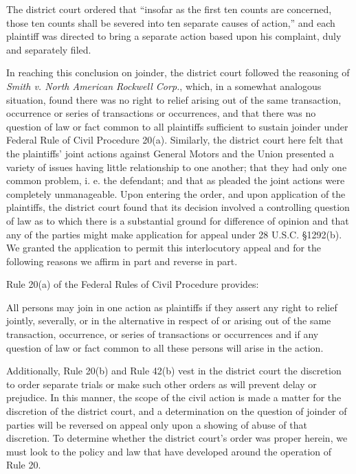 \documentclass[11pt,letterpaper,twoside]{article}
\renewenvironment{quote}{%
   \list{}{%
     \leftmargin2em   %
     \rightmargin\leftmargin\parsep .1em }
   \item\relax
}
{\endlist}
\begin{document}
The district court ordered that ``insofar as the first ten counts are
concerned, those ten counts shall be severed into ten separate causes of
action,'' and each plaintiff was directed to bring a separate action
based upon his complaint, duly and separately filed.

In reaching this conclusion on joinder, the district court followed the
reasoning of \emph{Smith v. North American Rockwell Corp.}, which, in a
somewhat analogous situation, found there was no right to relief arising
out of the same transaction, occurrence or series of transactions or
occurrences, and that there was no question of law or fact common to all
plaintiffs sufficient to sustain joinder under Federal Rule of Civil
Procedure 20(a). Similarly, the district court here felt that the
plaintiffs' joint actions against General Motors and the Union presented
a variety of issues having little relationship to one another; that they
had only one common problem, i. e. the defendant; and that as pleaded
the joint actions were completely unmanageable. Upon entering the order,
and upon application of the plaintiffs, the district court found that
its decision involved a controlling question of law as to which there is
a substantial ground for difference of opinion and that any of the
parties might make application for appeal under 28 U.S.C. §1292(b). We
granted the application to permit this interlocutory appeal and for the
following reasons we affirm in part and reverse in part.

Rule 20(a) of the Federal Rules of Civil Procedure provides:

\begin{quote}
All persons may join in one action as plaintiffs if they assert any
right to relief jointly, severally, or in the alternative in respect of
or arising out of the same transaction, occurrence, or series of
transactions or occurrences and if any question of law or fact common to
all these persons will arise in the action.
\end{quote}

Additionally, Rule 20(b) and Rule 42(b) vest in the district court the
discretion to order separate trials or make such other orders as will
prevent delay or prejudice. In this manner, the scope of the civil
action is made a matter for the discretion of the district court, and a
determination on the question of joinder of parties will be reversed on
appeal only upon a showing of abuse of that discretion. To determine
whether the district court's order was proper herein, we must look to
the policy and law that have developed around the operation of Rule 20.
\end{document}
